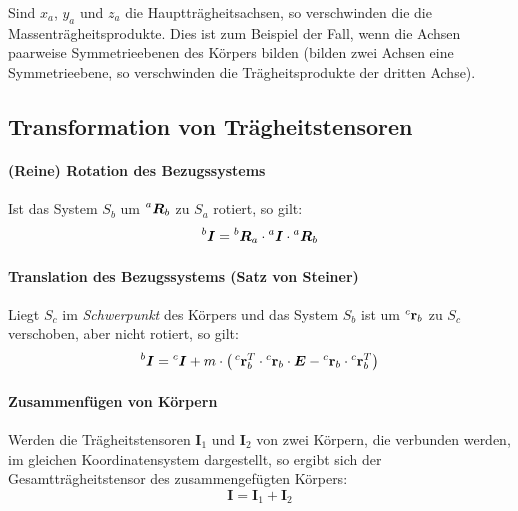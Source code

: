 \documentclass[a4paper, 11pt, accentcolor = tud3b]{tudreport}
\newcommand{\inreferenceto}[2]{\prescript{#1}{}{#2}}
\newcommand{\mat}[1]{\boldsymbol{#1}}
\renewcommand{\vec}[1]{\boldsymbol{\mathbf{#1}}}
\begin{document}
			Sind \(x_a\), \(y_a\) und \(z_a\) die Hauptträgheitsachsen, so verschwinden die die Massenträgheitsprodukte. Dies ist zum Beispiel der Fall, wenn die Achsen paarweise Symmetrieebenen des Körpers bilden (bilden zwei Achsen eine Symmetrieebene, so verschwinden die Trägheitsprodukte der dritten Achse).
			
			\subsection{Transformation von Trägheitstensoren}
				\paragraph{(Reine) Rotation des Bezugssystems}
				Ist das System \(S_b\) um \(\inreferenceto{a}{\mat{R}}_b\) zu \(S_a\) rotiert, so gilt:
				\begin{equation*}
					\inreferenceto{b}{\mat{I}} = \inreferenceto{b}{\mat{R}}_a \cdot \inreferenceto{a}{\mat{I}} \cdot \inreferenceto{a}{\mat{R}}_b
				\end{equation*}
				
				\paragraph{Translation des Bezugssystems (Satz von Steiner)}
				Liegt \(S_c\) im \emph{Schwerpunkt} des Körpers und das System \(S_b\) ist um \(\inreferenceto{c}{\vec{r}_b}\) zu \(S_c\) verschoben, aber nicht rotiert, so gilt:
				\begin{equation*}
					\inreferenceto{b}{\mat{I}} = \inreferenceto{c}{\mat{I}} + m \cdot \big( \inreferenceto{c}{\vec{r}}_b^T \cdot \inreferenceto{c}{\vec{r}}_b \cdot \mat{E} - \inreferenceto{c}{\vec{r}}_b \cdot \inreferenceto{c}{\vec{r}}_b^T \big)
				\end{equation*}
				
				\paragraph{Zusammenfügen von Körpern}
				Werden die Trägheitstensoren \( \mat{I}_1 \) und \( \mat{I}_2 \) von zwei Körpern, die verbunden werden, im gleichen Koordinatensystem dargestellt, so ergibt sich der Gesamtträgheitstensor des zusammengefügten Körpers:
				\begin{equation*}
					\mat{I} = \mat{I}_1 + \mat{I}_2
				\end{equation*}
\end{document}
